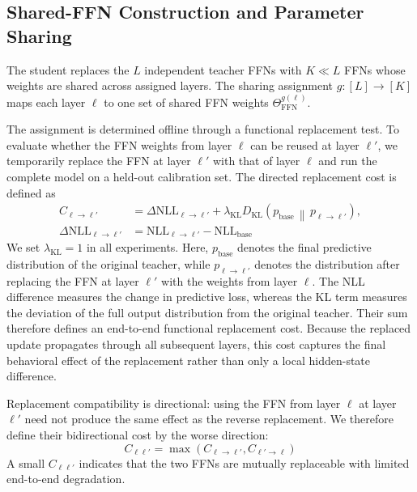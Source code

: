 \documentclass[letterpaper]{article} %
\newcommand{\KL}{\mathrm{KL}}
\newcommand{\FFN}{\mathrm{FFN}}
\theoremstyle{plain}
\theoremstyle{definition}
\begin{document}
\subsection{Shared-FFN Construction and Parameter Sharing}
\label{sec:assign}


The student replaces the $L$ independent teacher FFNs with
$K\!\ll\!L$ FFNs whose weights are shared across assigned layers. The sharing assignment $g:[L]\!\to\![K]$ maps each layer $\ell$ to one set of shared FFN weights $\Theta_{\FFN}^{g(\ell)}$.

The assignment is determined offline through a functional replacement test. To evaluate whether the FFN weights from layer $\ell$ can be reused at layer $\ell'$, we temporarily replace the FFN at layer $\ell'$ with that of layer $\ell$ and run the complete model on a held-out calibration set. The directed replacement cost is defined as
\begin{equation}
\begin{aligned}
  C_{\ell\to\ell'}
  &=
  \Delta\mathrm{NLL}_{\ell\to\ell'}
  +
  \lambda_{\KL}
  D_{\KL}\!\left(
    p_{\mathrm{base}}
    \,\middle\|\,
    p_{\ell\to\ell'}
  \right),
  \\
  \Delta\mathrm{NLL}_{\ell\to\ell'}
  &=
  \mathrm{NLL}_{\ell\to\ell'}
  -
  \mathrm{NLL}_{\mathrm{base}}
\end{aligned}
\label{eq:replace-cost}
\end{equation}
We set $\lambda_{\KL}=1$ in all experiments.
Here, $p_{\mathrm{base}}$ denotes the final predictive distribution of the
original teacher, while $p_{\ell\to\ell'}$ denotes the distribution after
replacing the FFN at layer $\ell'$ with the weights from layer $\ell$.
The NLL difference measures the change in predictive loss, whereas the KL
term measures the deviation of the full output distribution from the original
teacher. Their sum therefore defines an end-to-end functional replacement
cost. Because the replaced update propagates through all subsequent layers,
this cost captures the final behavioral effect of the replacement rather than
only a local hidden-state difference.

Replacement compatibility is directional: using the FFN from layer $\ell$
at layer $\ell'$ need not produce the same effect as the reverse replacement.
We therefore define their bidirectional cost by the worse direction:
\begin{equation}
  C_{\ell\ell'}
  =
  \max\!\left(
    C_{\ell\to\ell'},
    C_{\ell'\to\ell}
  \right)
  \label{eq:bidirectional-cost}
\end{equation}
A small $C_{\ell\ell'}$ indicates that the two FFNs are mutually replaceable
with limited end-to-end degradation.
\end{document}
